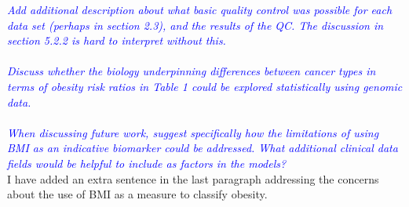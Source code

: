 \documentclass[a4paper, 12pt]{article}
\begin{document}
\noindent
\textcolor{blue}{
	\textit{Add additional description about what basic quality control was possible for each data set (perhaps in section 2.3), and the results of the QC.
	The discussion in section 5.2.2 is hard to interpret without this.
	}
}\\

\noindent
\\

\noindent
\textcolor{blue}{
	\textit{Discuss whether the biology underpinning differences between cancer types in terms of obesity risk ratios in Table 1 could be explored statistically using genomic data.
	}
}\\

\noindent
\\

\noindent
\textcolor{blue}{
	\textit{When discussing future work, suggest specifically how the limitations of using BMI as an indicative biomarker could be addressed.
	What additional clinical data fields would be helpful to include as factors in the models?
	}
}\\

\noindent
I have added an extra sentence in the last paragraph addressing the concerns about the use of BMI as a measure to classify obesity.
\\
\end{document}
